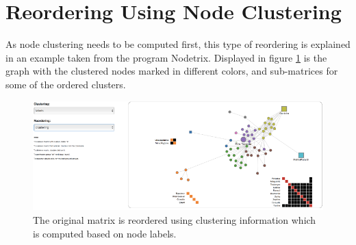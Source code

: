\section{Reordering Using Node Clustering}
As node clustering needs to be computed first, this type of reordering is explained in an example taken from the program Nodetrix. Displayed in figure \ref{fig:reordering_nodetrix_cluster} is the graph with the clustered nodes marked in different colors, and sub-matrices for some of the ordered clusters.

\begin{figure}[tp]
  \centering
  \includegraphics[keepaspectratio,width=\hsize,height=\halfh]
  {images/Reordering_NodeTrix_cluster.png}
  
  \caption[Reordered Matrix Based on Clustering]{
  The original matrix is reordered using clustering information which is computed based on node labels.
  }
  \label{fig:reordering_nodetrix_cluster}
\end{figure}
